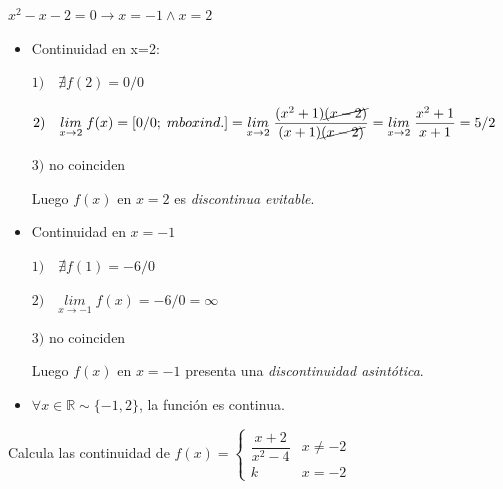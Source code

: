 	\begin{proofw}\renewcommand{\qedsymbol}{$\diamond$}
	
	$x^2-x-2=0 \to x=-1 \wedge x=2$
	
	\begin{itemize}
		\item Continuidad en x=2:
		
		$1) \quad \nexists f(2)=0/0$
		
		$2) \quad \underset{x\to 2}{lim}\; {f(x)}=[0/0;\; mbox{ind.}] =\underset{x\to 2}{lim}\; {\dfrac {(x^2+1)\cancel{(x-2)}}{(x+1)\cancel{(x-2)}}}=\underset {x\to 2}{lim}\; {\dfrac {x^2+1}{x+1}}=5/2$
		
		$3) $ no coinciden
		
		Luego $f(x)$ en $x=2$ es \emph{discontinua evitable}.
		
		\item Continuidad en $x=-1$
		
		$1)\quad \nexists f(1)=-6/0$
		
		$2) \quad \underset {x\to -1}{lim}\; {f(x)}=-6/0=\infty$
		
		$3) $ no coinciden
		
		Luego $f(x)$ en $x=-1$ presenta una \emph{discontinuidad asintótica}.
		\item $\forall x\in \mathbb R \sim \{-1,2 \}$, la función es continua.
	
	\end{itemize}
		
	\end{proofw}
	
	\begin{ejre} Calcula las continuidad de $f(x)=\left\{ \begin{matrix} \dfrac{x+2}{x^2-4} & x\neq -2 \\ k & x=-2 \end{matrix} \right. $
		
	\end{ejre}
	
